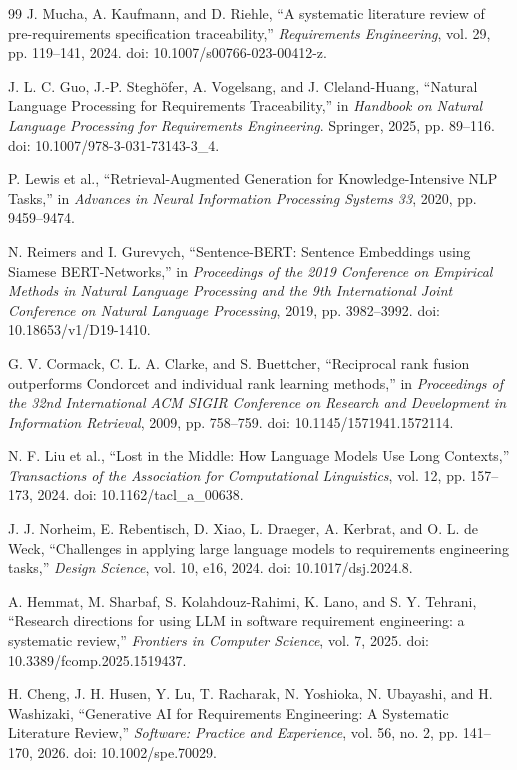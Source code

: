 \begin{thebibliography}{99}
J. Mucha, A. Kaufmann, and D. Riehle,
“A systematic literature review of pre-requirements specification traceability,”
\emph{Requirements Engineering}, vol. 29, pp. 119--141, 2024.
doi: 10.1007/s00766-023-00412-z.

J. L. C. Guo, J.-P. Steghöfer, A. Vogelsang, and J. Cleland-Huang,
“Natural Language Processing for Requirements Traceability,”
in \emph{Handbook on Natural Language Processing for Requirements Engineering}.
Springer, 2025, pp. 89--116.
doi: 10.1007/978-3-031-73143-3\_4.

P. Lewis et al.,
“Retrieval-Augmented Generation for Knowledge-Intensive NLP Tasks,”
in \emph{Advances in Neural Information Processing Systems 33},
2020, pp. 9459--9474.

N. Reimers and I. Gurevych,
“Sentence-BERT: Sentence Embeddings using Siamese BERT-Networks,”
in \emph{Proceedings of the 2019 Conference on Empirical Methods in Natural Language Processing and the 9th International Joint Conference on Natural Language Processing},
2019, pp. 3982--3992.
doi: 10.18653/v1/D19-1410.

G. V. Cormack, C. L. A. Clarke, and S. Buettcher,
“Reciprocal rank fusion outperforms Condorcet and individual rank learning methods,”
in \emph{Proceedings of the 32nd International ACM SIGIR Conference on Research and Development in Information Retrieval},
2009, pp. 758--759.
doi: 10.1145/1571941.1572114.

N. F. Liu et al.,
“Lost in the Middle: How Language Models Use Long Contexts,”
\emph{Transactions of the Association for Computational Linguistics},
vol. 12, pp. 157--173, 2024.
doi: 10.1162/tacl\_a\_00638.

J. J. Norheim, E. Rebentisch, D. Xiao, L. Draeger, A. Kerbrat, and O. L. de Weck,
“Challenges in applying large language models to requirements engineering tasks,”
\emph{Design Science}, vol. 10, e16, 2024.
doi: 10.1017/dsj.2024.8.

A. Hemmat, M. Sharbaf, S. Kolahdouz-Rahimi, K. Lano, and S. Y. Tehrani,
“Research directions for using LLM in software requirement engineering: a systematic review,”
\emph{Frontiers in Computer Science}, vol. 7, 2025.
doi: 10.3389/fcomp.2025.1519437.

H. Cheng, J. H. Husen, Y. Lu, T. Racharak, N. Yoshioka, N. Ubayashi, and H. Washizaki,
“Generative AI for Requirements Engineering: A Systematic Literature Review,”
\emph{Software: Practice and Experience}, vol. 56, no. 2, pp. 141--170, 2026.
doi: 10.1002/spe.70029.


\end{thebibliography}
